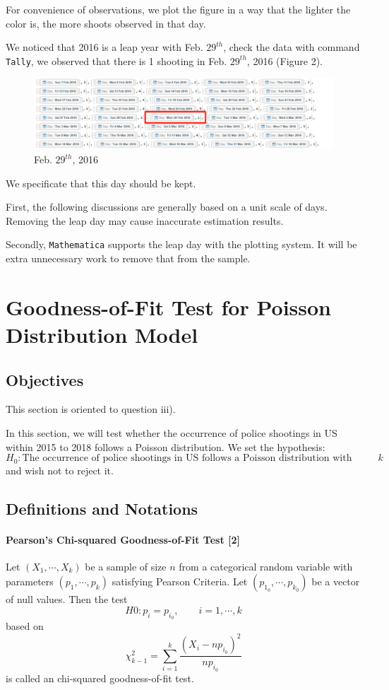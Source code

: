 \documentclass[a4paper]{article}
\begin{document}
For convenience of observations, we plot the figure in a way that the lighter the color is, the more shoots observed in that day.

\newpage

We noticed that 2016 is a leap year with Feb. $29^{th}$, check the data with command \texttt{Tally}, we observed that there is 1 shooting in Feb. $29^{th}$, 2016 (Figure 2).

\begin{figure}[!htbp]
\centering
\includegraphics[width=1.1\linewidth]{leap.png}
\caption{Feb. $29^{th}$, 2016}
\end{figure}

We specificate that this day should be kept.

First, the following discussions are generally based on a unit scale of days. Removing the leap day may cause inaccurate estimation results.

Secondly, \texttt{Mathematica} supports the leap day with the plotting system. It will be extra unnecessary work to remove that from the sample.
\section{Goodness-of-Fit Test for Poisson Distribution Model}
\subsection{Objectives}
This section is oriented to question iii).

In this section, we will test whether the occurrence of police shootings in US within 2015 to 2018 follows a Poisson distribution. We set the hypothesis:
$$H_0: \text{The occurrence of police shootings in US follows a Poisson distribution with parameter }k$$
and wish not to reject it.
\subsection{Definitions and Notations}
\paragraph{Pearson's Chi-squared Goodness-of-Fit Test [2]}
Let $(X_1,\cdots,X_k)$ be a sample of size $n$ from a categorical random variable with parameters $(p_1,\cdots,p_k)$ satisfying Pearson Criteria. Let $(p_{1_0},\cdots,p_{k_0})$ be a vector of null values. Then the test
$$H0: p_i = p_{i_0},\qquad i = 1,\cdots,k$$
based on
$$\chi_{k-1}^2 = \sum^k_{i=1}\frac{(X_i-np_{i_0})^2}{np_{i_0}}$$
is called an chi-squared goodness-of-fit test.
\end{document}
